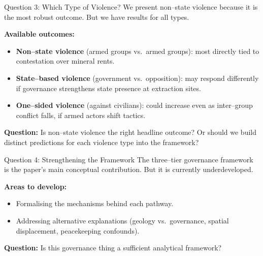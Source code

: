 \documentclass[aspectratio=169,11pt]{beamer}
\newcommand{\audience}[1]{%
  \vspace{0.5em}%
  {\color{lime}\textbf{Question:}} {\color{cream}#1}%
}
\begin{document}
\begin{frame}{Question 3: Which Type of Violence?}
We present non--state violence because it is the most robust outcome. But we have results for all types.

\vspace{0.5em}
\textcolor{sage}{\textbf{Available outcomes:}}
\begin{itemize}
    \item \textbf{Non--state violence} (armed groups vs.\ armed groups): most directly tied to contestation over mineral rents.
    \item \textbf{State--based violence} (government vs.\ opposition): may respond differently if governance strengthens state presence at extraction sites.
    \item \textbf{One--sided violence} (against civilians): could increase even as inter--group conflict falls, if armed actors shift tactics.
\end{itemize}

\vspace{0.3em}

\audience{Is non--state violence the right headline outcome? Or should we build distinct predictions for each violence type into the framework?}
\end{frame}


\begin{frame}{Question 4: Strengthening the Framework}
The three--tier governance framework is the paper's main conceptual contribution. But it is currently underdeveloped.

\vspace{0.5em}
\textcolor{sage}{\textbf{Areas to develop:}}
\begin{itemize}
    \item Formalising the mechanisms behind each pathway.
    \item Addressing alternative explanations (geology vs.\ governance, spatial displacement, peacekeeping confounds).
\end{itemize}

\vspace{0.5em}
\audience{Is this governance thing a sufficient analytical framework?}
\end{frame}
\end{document}
